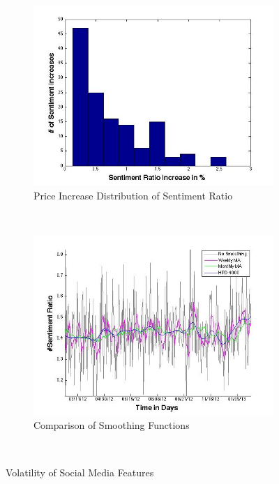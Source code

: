 \begin{figure}[ht]
        \centering
        \begin{subfigure}[b]{0.5\textwidth}
                \includegraphics[width=\textwidth]{img/model/sentiment_increase}
                \caption{Price Increase Distribution of Sentiment Ratio}
                \label{fig:inc_dist}
        \end{subfigure}%
        ~ %
        \begin{subfigure}[b]{0.5\textwidth}
                \includegraphics[width=\textwidth]{img/model/smoothing_variance}
                \caption{Comparison of Smoothing Functions}
                \label{fig:s_effect}
        \end{subfigure}
        ~ %

      
        \caption{Volatility of Social Media Features}\label{fig:distribution}
\end{figure}





